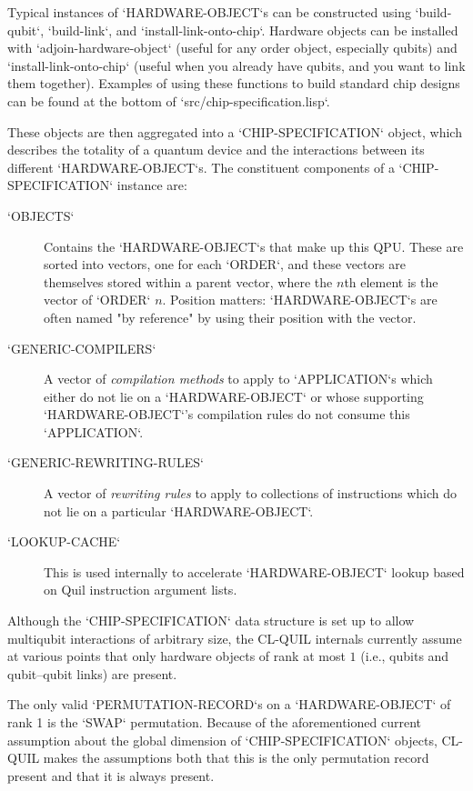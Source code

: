 Typical instances of `HARDWARE-OBJECT`s can be constructed using `build-qubit`, `build-link`, and `install-link-onto-chip`.  Hardware objects can be installed with `adjoin-hardware-object` (useful for any order object, especially qubits) and `install-link-onto-chip` (useful when you already have qubits, and you want to link them together).  Examples of using these functions to build standard chip designs can be found at the bottom of `src/chip-specification.lisp`.

These objects are then aggregated into a `CHIP-SPECIFICATION` object, which describes the totality of a quantum device and the interactions between its different `HARDWARE-OBJECT`s.  The constituent components of a `CHIP-SPECIFICATION` instance are:

\begin{description}
	\item[`OBJECTS`] Contains the `HARDWARE-OBJECT`s that make up this QPU.  These are sorted into vectors, one for each `ORDER`, and these vectors are themselves stored within a parent vector, where the $n$th element is the vector of `ORDER` $n$.  Position matters: `HARDWARE-OBJECT`s are often named "by reference" by using their position with the vector.
	\item[`GENERIC-COMPILERS`] A vector of \textit{compilation methods} to apply to `APPLICATION`s which either do not lie on a `HARDWARE-OBJECT` or whose supporting `HARDWARE-OBJECT`'s compilation rules do not consume this `APPLICATION`.
	\item[`GENERIC-REWRITING-RULES`] A vector of \textit{rewriting rules} to apply to collections of instructions which do not lie on a particular `HARDWARE-OBJECT`.
	\item[`LOOKUP-CACHE`] This is used internally to accelerate `HARDWARE-OBJECT` lookup based on Quil instruction argument lists.
\end{description}

\begin{remark}
Although the `CHIP-SPECIFICATION` data structure is set up to allow multiqubit interactions of arbitrary size, the CL-QUIL internals currently assume at various points that only hardware objects of rank at most $1$ (i.e., qubits and qubit--qubit links) are present.
\end{remark}

\begin{remark}
The only valid `PERMUTATION-RECORD`s on a `HARDWARE-OBJECT` of rank 1 is the `SWAP` permutation.  Because of the aforementioned current assumption about the global dimension of `CHIP-SPECIFICATION` objects, CL-QUIL makes the assumptions both that this is the only permutation record present and that it is always present.
\end{remark}


